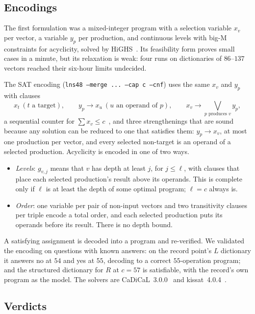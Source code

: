 \documentclass[11pt]{article}
\theoremstyle{remark}
\begin{document}
\subsection{Encodings}

The first formulation was a mixed-integer program with a selection
variable $x_v$ per vector, a variable $y_p$ per production, and
continuous levels with big-M constraints for acyclicity, solved by
HiGHS~\cite{HiGHS}.  Its feasibility form proves small cases in a
minute, but its relaxation is weak: four runs on dictionaries of
$86$--$137$ vectors reached their six-hour limits undecided.

The SAT encoding (\texttt{lns48 --merge ... --cap c --cnf}) uses the same
$x_v$ and $y_p$ with clauses
\[
x_t\ (t\text{ a target}),\qquad
y_p\to x_u\ (u\text{ an operand of }p),\qquad
x_v\to\textstyle\bigvee_{p\text{ produces }v}y_p,
\]
a sequential counter for $\sum x_v\le c$~\cite{Sinz05}, and three
strengthenings that are sound because any solution can be reduced to
one that satisfies them: $y_p\to x_v$, at most one production per
vector, and every selected non-target is an operand of a selected
production.  Acyclicity is encoded in one of two ways.
\begin{itemize}
\item \emph{Levels}: $g_{v,j}$ means that $v$ has depth at least $j$, for
  $j\le\ell$, with clauses that place each selected production's result
  above its operands.  This is complete only if $\ell$ is at least the
  depth of some optimal program; $\ell=c$ always is.
\item \emph{Order}: one variable per pair of non-input vectors and two
  transitivity clauses per triple encode a total order, and each
  selected production puts its operands before its result.  There is no
  depth bound.
\end{itemize}
A satisfying assignment is decoded into a program and re-verified.  We
validated the encoding on questions with known answers: on the record
point's $L$ dictionary it answers no at $54$ and yes at $55$, decoding to
a correct $55$-operation program; and the structured dictionary for $R$
at $c=57$ is satisfiable, with the record's own program as the model.
The solvers are CaDiCaL~3.0.0~\cite{CaDiCaL} and kissat~4.0.4~\cite{Kissat}.

\subsection{Verdicts}
\end{document}
